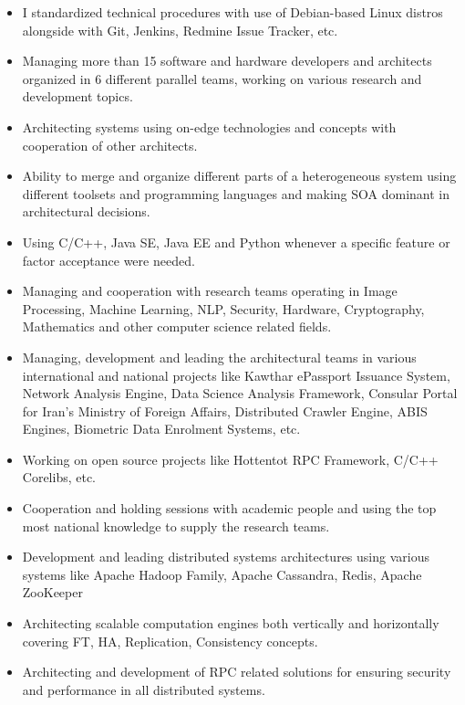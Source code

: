 \documentclass[10pt,a4paper]{article}
\begin{document}
  \begin{itemize}
    \setlength{\rightskip}{2cm}
    \setlength\itemsep{0em}
    \item I standardized technical procedures with use of Debian-based Linux distros alongside with Git, Jenkins, Redmine Issue Tracker, etc.
    \item Managing more than 15 software and hardware developers and architects organized in 6 different parallel teams, working on various research and development topics.
    \item Architecting systems using on-edge technologies and concepts with cooperation of other architects.
    \item Ability to merge and organize different parts of a heterogeneous system using different toolsets and programming languages and making SOA dominant in architectural decisions.
    \item Using C/C++, Java SE, Java EE and Python whenever a specific feature or factor acceptance were needed.
    \item Managing and cooperation with research teams operating in Image Processing, Machine Learning, NLP, Security, Hardware, Cryptography, Mathematics and other computer science related fields.
    \item Managing, development and leading the architectural teams in various international and national projects like Kawthar ePassport Issuance System, Network Analysis Engine, Data Science Analysis Framework, Consular Portal for Iran's Ministry of Foreign Affairs, Distributed Crawler Engine, ABIS Engines, Biometric Data Enrolment Systems, etc.
    \item Working on open source projects like Hottentot RPC Framework, C/C++ Corelibs, etc.
    \item Cooperation and holding sessions with academic people and using the top most national knowledge to supply the research teams.
    \item Development and leading distributed systems architectures using various systems like Apache Hadoop Family, Apache Cassandra, Redis, Apache ZooKeeper
    \item Architecting scalable computation engines both vertically and horizontally covering FT, HA, Replication, Consistency  concepts.
    \item Architecting and development of RPC related solutions for ensuring security and performance in all distributed systems.
  \end{itemize}
  \setlength{\leftskip}{0pt}
  \setlength{\rightskip}{0cm}
	  
\end{document}
